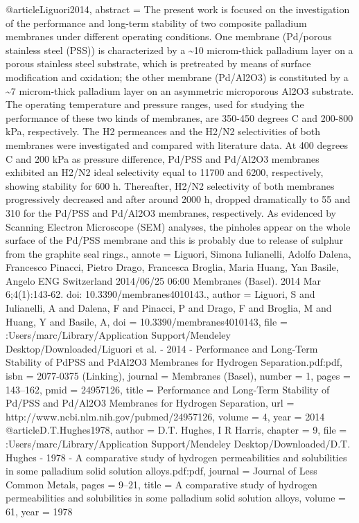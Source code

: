 @article{Liguori2014,
abstract = {The present work is focused on the investigation of the performance and long-term stability of two composite palladium membranes under different operating conditions. One membrane (Pd/porous stainless steel (PSS)) is characterized by a {\~{}}10 microm-thick palladium layer on a porous stainless steel substrate, which is pretreated by means of surface modification and oxidation; the other membrane (Pd/Al2O3) is constituted by a {\~{}}7 microm-thick palladium layer on an asymmetric microporous Al2O3 substrate. The operating temperature and pressure ranges, used for studying the performance of these two kinds of membranes, are 350-450 degrees C and 200-800 kPa, respectively. The H2 permeances and the H2/N2 selectivities of both membranes were investigated and compared with literature data. At 400 degrees C and 200 kPa as pressure difference, Pd/PSS and Pd/Al2O3 membranes exhibited an H2/N2 ideal selectivity equal to 11700 and 6200, respectively, showing stability for 600 h. Thereafter, H2/N2 selectivity of both membranes progressively decreased and after around 2000 h, dropped dramatically to 55 and 310 for the Pd/PSS and Pd/Al2O3 membranes, respectively. As evidenced by Scanning Electron Microscope (SEM) analyses, the pinholes appear on the whole surface of the Pd/PSS membrane and this is probably due to release of sulphur from the graphite seal rings.},
annote = {Liguori, Simona
Iulianelli, Adolfo
Dalena, Francesco
Pinacci, Pietro
Drago, Francesca
Broglia, Maria
Huang, Yan
Basile, Angelo
ENG
Switzerland
2014/06/25 06:00
Membranes (Basel). 2014 Mar 6;4(1):143-62. doi: 10.3390/membranes4010143.},
author = {Liguori, S and Iulianelli, A and Dalena, F and Pinacci, P and Drago, F and Broglia, M and Huang, Y and Basile, A},
doi = {10.3390/membranes4010143},
file = {:Users/marc/Library/Application Support/Mendeley Desktop/Downloaded/Liguori et al. - 2014 - Performance and Long-Term Stability of PdPSS and PdAl2O3 Membranes for Hydrogen Separation.pdf:pdf},
isbn = {2077-0375 (Linking)},
journal = {Membranes (Basel)},
number = {1},
pages = {143--162},
pmid = {24957126},
title = {{Performance and Long-Term Stability of Pd/PSS and Pd/Al2O3 Membranes for Hydrogen Separation}},
url = {http://www.ncbi.nlm.nih.gov/pubmed/24957126},
volume = {4},
year = {2014}
}
@article{D.T.Hughes1978,
author = {{D.T. Hughes}, I R Harris},
chapter = {9},
file = {:Users/marc/Library/Application Support/Mendeley Desktop/Downloaded/D.T. Hughes - 1978 - A comparative study of hydrogen permeabilities and solubilities in some palladium solid solution alloys.pdf:pdf},
journal = {Journal of Less Common Metals},
pages = {9--21},
title = {{A comparative study of hydrogen permeabilities and solubilities in some palladium solid solution alloys}},
volume = {61},
year = {1978}
}
